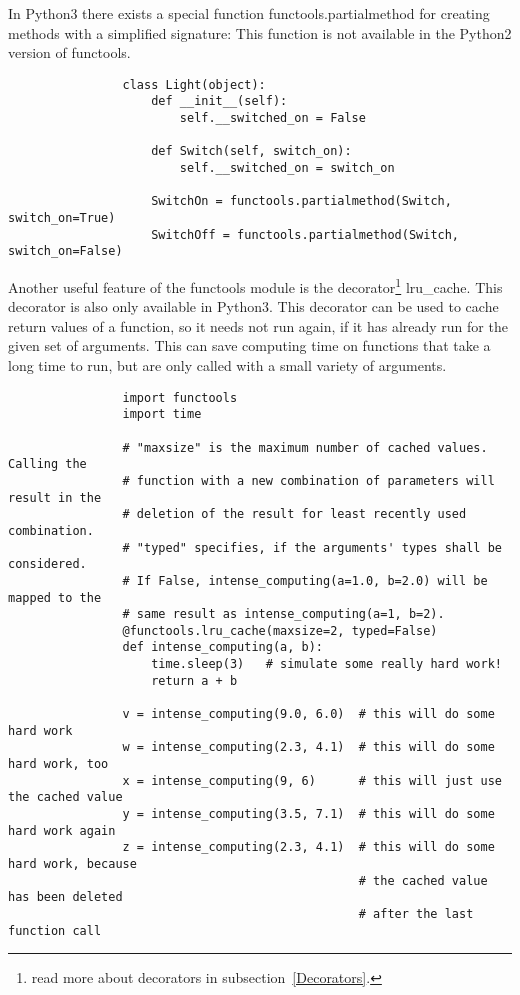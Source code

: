 			In Python3 there exists a special function {\normalfont \ttfamily functools.partialmethod} for creating methods with a simplified signature:
			This function is not available in the Python2 version of functools.
			\begin{verbatim}
				class Light(object):
					def __init__(self):
						self.__switched_on = False

					def Switch(self, switch_on):
						self.__switched_on = switch_on

					SwitchOn = functools.partialmethod(Switch, switch_on=True)
					SwitchOff = functools.partialmethod(Switch, switch_on=False)
			\end{verbatim}

			Another useful feature of the functools module is the decorator\footnote{read more about decorators in subsection~\ref{Decorators}.} {\normalfont \ttfamily lru\_cache}.
			This decorator is also only available in Python3.
			This decorator can be used to cache return values of a function, so it needs not run again, if it has already run for the given set of arguments.
			This can save computing time on functions that take a long time to run, but are only called with a small variety of arguments.
			\begin{verbatim}
				import functools
				import time

				# "maxsize" is the maximum number of cached values. Calling the
				# function with a new combination of parameters will result in the
				# deletion of the result for least recently used combination.
				# "typed" specifies, if the arguments' types shall be considered.
				# If False, intense_computing(a=1.0, b=2.0) will be mapped to the
				# same result as intense_computing(a=1, b=2).
				@functools.lru_cache(maxsize=2, typed=False)
				def intense_computing(a, b):
					time.sleep(3)	# simulate some really hard work!
					return a + b

				v = intense_computing(9.0, 6.0)  # this will do some hard work
				w = intense_computing(2.3, 4.1)  # this will do some hard work, too
				x = intense_computing(9, 6)      # this will just use the cached value
				y = intense_computing(3.5, 7.1)  # this will do some hard work again
				z = intense_computing(2.3, 4.1)  # this will do some hard work, because
				                                 # the cached value has been deleted
				                                 # after the last function call
			\end{verbatim}

